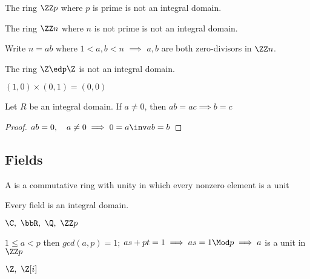 \begin{example}
  The ring \(\ZZ p\) where \(p\) is prime is not an integral domain.
\end{example}

\begin{nonexample}
  The ring \(\ZZ n\) where \(n\) is not prime is not an integral domain.
  \begin{note}
    Write \(n=ab\) where \(1<a,b<n\) \(\implies\) \(a,b\) are both zero-divisors in \(\ZZ n\).
  \end{note}
\end{nonexample}

\begin{nonexample}
  The ring \(\Z \edp \Z\) is not an integral domain.
  \begin{note}
    \((1,0)\times(0,1) = (0,0)\)
  \end{note}
\end{nonexample}

\begin{theorem}[Cancellation]
  Let \(R\) be an integral domain. If \(a\neq 0\), then \(ab=ac\implies b=c\)
\end{theorem}

\begin{proof}
  \(ab = 0,\quad a\neq 0 \implies 0=a\inv ab = b\)
\end{proof}

\subsection{Fields}
\begin{definition}[Field]
  A  is a commutative ring with unity in which every nonzero element is a unit
\end{definition}

\begin{fact}
  Every field is an integral domain.
\end{fact}

\begin{examples}
  \(\C,\ \bbR,\ \Q,\ \ZZ p\)
  \begin{note}[\(\ZZ p\)]
    \(1\leq a < p\) then \(gcd(a,p) = 1\); \(as+pt=1 \implies as = 1 \Mod p \implies a\) is a unit in \(\ZZ p\)
  \end{note}
\end{examples}

\begin{nonexamples}
  \(\Z,\ \Z[i]\)
\end{nonexamples}

